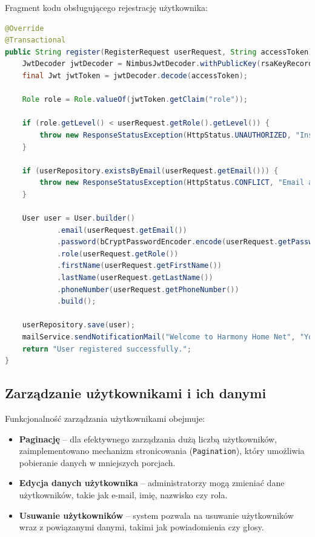 Fragment kodu obsługującego rejestrację użytkownika:
\begin{lstlisting}[language=Java, style=JavaStyle, caption=Rejestracja użytkownika w \texttt{AuthServiceImp}]
@Override
@Transactional
public String register(RegisterRequest userRequest, String accessToken) {
    JwtDecoder jwtDecoder = NimbusJwtDecoder.withPublicKey(rsaKeyRecord.publicKey()).build();
    final Jwt jwtToken = jwtDecoder.decode(accessToken);

    Role role = Role.valueOf(jwtToken.getClaim("role"));

    if (role.getLevel() < userRequest.getRole().getLevel()) {
        throw new ResponseStatusException(HttpStatus.UNAUTHORIZED, "Insufficient permissions to update or assign the role");
    }

    if (userRepository.existsByEmail(userRequest.getEmail())) {
        throw new ResponseStatusException(HttpStatus.CONFLICT, "Email already exists");
    }

    User user = User.builder()
            .email(userRequest.getEmail())
            .password(bCryptPasswordEncoder.encode(userRequest.getPassword()))
            .role(userRequest.getRole())
            .firstName(userRequest.getFirstName())
            .lastName(userRequest.getLastName())
            .phoneNumber(userRequest.getPhoneNumber())
            .build();

    userRepository.save(user);
    mailService.sendNotificationMail("Welcome to Harmony Home Net", "Your account has been successfully created.", user.getEmail());
    return "User registered successfully.";
}
\end{lstlisting}

\subsection{Zarządzanie użytkownikami i ich danymi}

Funkcjonalność zarządzania użytkownikami obejmuje:
\begin{itemize}
    \item \textbf{Paginację} -- dla efektywnego zarządzania dużą liczbą użytkowników, zaimplementowano mechanizm stronicowania (\texttt{Pagination}), który umożliwia pobieranie danych w mniejszych porcjach.
    \item \textbf{Edycja danych użytkownika} -- administratorzy mogą zmieniać dane użytkowników, takie jak e-mail, imię, nazwisko czy rola.
    \item \textbf{Usuwanie użytkowników} -- system pozwala na usuwanie użytkowników wraz z powiązanymi danymi, takimi jak powiadomienia czy głosy.
\end{itemize}

